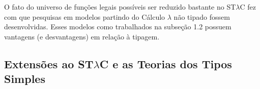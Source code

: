 \documentclass[../main.tex]{subfiles}
\begin{document}
O fato do universo de funções legais possíveis ser reduzido bastante no ST$\lambda$C fez com que pesquisas em modelos partindo do Cálculo $\lambda$ não tipado fossem desenvolvidas. Esses modelos como trabalhados na subseção 1.2 possuem vantagens (e desvantagens) em relação à tipagem.

\subsection[Extensões ao STLC e as Teorias dos Tipos Simples]{Extensões ao ST$\lambda$C e as Teorias dos Tipos Simples}



\end{document}
